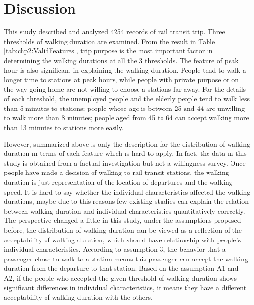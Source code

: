 %
\section{Discussion}
This study described and analyzed 4254 records of rail transit trip. Three thresholds of walking duration are examined. From the result in Table \ref{tab:chp2:ValidFeatures}, trip purpose is the most important factor in determining the walking durations at all the 3 thresholds. The feature of peak hour is also significant in explaining the walking duration. People tend to walk a longer time to stations at peak hours, while people with private purpose or on the way going home are not willing to choose a stations far away. For the details of each threshold, the unemployed people and the elderly people tend to walk less than 5 minutes to stations; people whose age is between 25 and 44 are unwilling to walk more than 8 minutes; people aged from 45 to 64 can accept walking more than 13 minutes to stations more easily.

%
However, summarized above is only the description for the distribution of walking duration in terms of each feature which is hard to apply. In fact, the data in this study is obtained from a factual investigation but not a willingness survey. Once people have made a decision of walking to rail transit stations, the walking duration is just representation of the location of departures and the walking speed. It is hard to say whether the individual characteristics affected the walking durations, maybe due to this reasons few existing studies can explain the relation between walking duration and individual characteristics quantitatively correctly. The perspective changed a little in this study, under the assumptions proposed before, the distribution of walking duration can be viewed as a reflection of the acceptability of walking duration, which should have relationship with people's individual characteristics. According to assumption 3, the behavior that a passenger chose to walk to a station means this passenger can accept the walking duration from the departure to that station. Based on the assumption A1 and A2, if the people who accepted the given threshold of walking duration shows significant differences in individual characteristics, it means they have a different acceptability of walking duration with the others.

